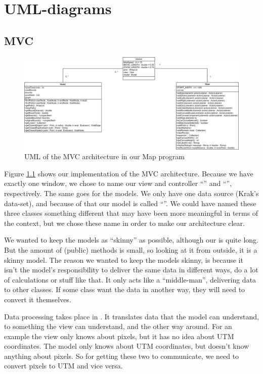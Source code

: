 \chapter{UML-diagrams}
\label{UML}

\section{MVC}
\label{UML-MVC}
\begin{figure}[h!]
\centering
\includegraphics[width=1.25\linewidth]{images/mvc-map}
\caption{UML of the MVC architecture in our Map program}
\label{mvc-map}
\end{figure}

Figure \ref{mvc-map} shows our implementation of the MVC architecture. Because we 
have exactly one window, we chose to name our view and controller ``'' and 
``'', respectively. The same goes for the models. We only have one data 
source (Krak's data-set), and because of that our model is called ``''. We could 
have named these three classes something different that may have been more meaningful 
in terms of the  context, but we chose these name in order to make 
our architecture clear.

We wanted to keep the models as ``skinny'' as possible, 
although our  is quite long. But the amount of (public) methods is small, so 
looking at it from outside, it is a skinny model. The reason we wanted to keep the models 
skinny, is because it isn't the model's responsibility to deliver the same data in different ways, 
do a lot of calculations or stuff like that. It only acts like a ``middle-man'', delivering data to 
other classes. If some class want the data in another way, they will need to convert it 
themselves.

Data processing takes place in . It translates data that the model can 
understand, to something the view can understand, and the other way around. For 
an example the view only knows about pixels, but it has no idea about UTM 
coordinates. The model only knows about UTM coordinates, but doesn't know anything 
about pixels. So for getting these two to communicate, we need to convert pixels to 
UTM and vice versa.


